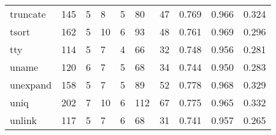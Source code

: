 \begin{longtable}{lp{2.0cm}p{2.0cm}p{2.0cm}p{2.0cm}p{2.0cm}p{2.0cm}p{2.0cm}p{2.0cm}p{2.0cm}}
truncate  &                    145 &                                  5 &                                 8 &                                5 &                                80 &                              47 &                                   0.769 &                                  0.966 &                                0.324 \\
tsort     &                    162 &                                  5 &                                10 &                                6 &                                93 &                              48 &                                   0.761 &                                  0.969 &                                0.296 \\
tty       &                    114 &                                  5 &                                 7 &                                4 &                                66 &                              32 &                                   0.748 &                                  0.956 &                                0.281 \\
uname     &                    120 &                                  6 &                                 7 &                                5 &                                68 &                              34 &                                   0.744 &                                  0.950 &                                0.283 \\
unexpand  &                    158 &                                  5 &                                 7 &                                5 &                                89 &                              52 &                                   0.778 &                                  0.968 &                                0.329 \\
uniq      &                    202 &                                  7 &                                10 &                                6 &                               112 &                              67 &                                   0.775 &                                  0.965 &                                0.332 \\
unlink    &                    117 &                                  5 &                                 7 &                                6 &                                68 &                              31 &                                   0.741 &                                  0.957 &                                0.265 \\

\end{longtable}
